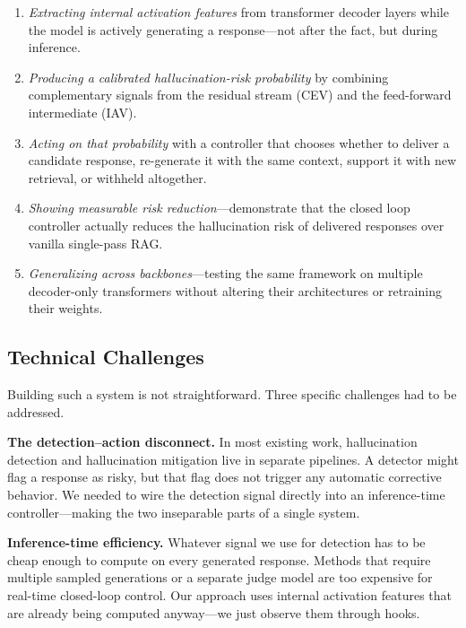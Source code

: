 \begin{enumerate}
    \item \emph{Extracting internal activation features} from transformer decoder layers while the model is actively generating a response—not after the fact, but during inference.
    \item \emph{Producing a calibrated hallucination-risk probability} by combining complementary signals from the residual stream (CEV) and the feed-forward intermediate (IAV).
\item \emph{Acting on that probability} with a controller that chooses whether to deliver a candidate response, re-generate it with the same context, support it with new retrieval, or withheld altogether.


 \item \emph{Showing measurable risk reduction}—demonstrate that the closed loop controller actually reduces the hallucination risk of delivered responses over vanilla single-pass RAG.
 
    \item \emph{Generalizing across backbones}—testing the same framework on multiple decoder-only transformers without altering their architectures or retraining their weights.
\end{enumerate}

\subsection{Technical Challenges}
\label{subsec:technical_challenges}

Building such a system is not straightforward. Three specific challenges had to be addressed.

\textbf{The detection–action disconnect.} In most existing work, hallucination detection and hallucination mitigation live in separate pipelines. A detector might flag a response as risky, but that flag does not trigger any automatic corrective behavior. We needed to wire the detection signal directly into an inference-time controller—making the two inseparable parts of a single system.

\textbf{Inference-time efficiency.} Whatever signal we use for detection has to be cheap enough to compute on every generated response. Methods that require multiple sampled generations or a separate judge model are too expensive for real-time closed-loop control. Our approach uses internal activation features that are already being computed anyway—we just observe them through hooks.

